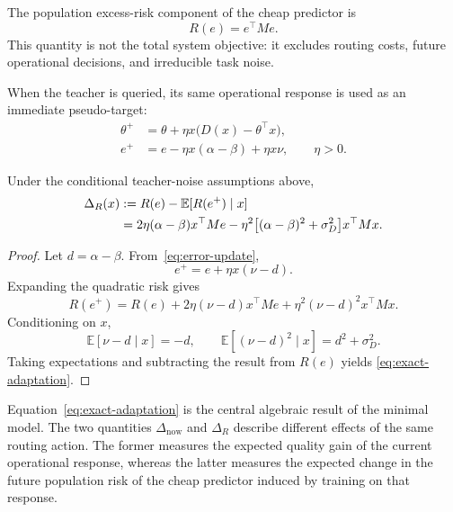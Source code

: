 The population excess-risk component of the cheap predictor is
\begin{equation}
    R(e)=e^\top M e.
    \label{eq:population-risk}
\end{equation}
This quantity is not the total system objective: it excludes routing costs,
future operational decisions, and irreducible task noise.

When the teacher is queried, its same operational response is used as an
immediate pseudo-target:
\begin{align}
    \theta^+
    &= \theta+\eta x\bigl(D(x)-\theta^\top x\bigr),
    \\
    e^+
    &= e-\eta x(\alpha-\beta)+\eta x\nu,
    \qquad \eta>0.
    \label{eq:error-update}
\end{align}

\begin{adaptationlemma}
Under the conditional teacher-noise assumptions above,
\begin{align}
    \Delta_R(x)
    &:= R(e)-\mathbb E[R(e^+)\mid x]
    \notag\\
    &= 2\eta(\alpha-\beta)x^\top M e
    -\eta^2
    \bigl[(\alpha-\beta)^2+\sigma_D^2\bigr]
    x^\top Mx .
    \label{eq:exact-adaptation}
\end{align}
\end{adaptationlemma}

\begin{proof}
Let $d=\alpha-\beta$. From~\eqref{eq:error-update},
\begin{equation}
    e^+=e+\eta x(\nu-d).
\end{equation}
Expanding the quadratic risk gives
\begin{equation}
    R(e^+)
    =
    R(e)
    +2\eta(\nu-d)x^\top Me
    +\eta^2(\nu-d)^2x^\top Mx.
\end{equation}
Conditioning on $x$,
\begin{equation}
    \mathbb E[\nu-d\mid x]=-d,
    \qquad
    \mathbb E[(\nu-d)^2\mid x]=d^2+\sigma_D^2.
\end{equation}
Taking expectations and subtracting the result from $R(e)$ yields
\eqref{eq:exact-adaptation}.
\end{proof}

Equation~\eqref{eq:exact-adaptation} is the central algebraic result of the
minimal model. The two quantities
$\Delta_{\mathrm{now}}$ and $\Delta_R$ describe different effects of the
same routing action. The former measures the expected quality gain of the
current operational response, whereas the latter measures the expected
change in the future population risk of the cheap predictor induced by
training on that response.

